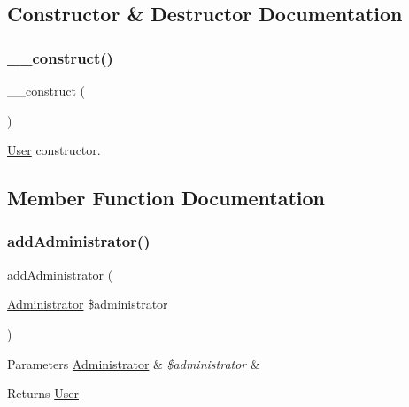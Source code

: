 \subsection{Constructor \& Destructor Documentation}
\mbox{\label{class_app_1_1_entity_1_1_user_a095c5d389db211932136b53f25f39685}} 
\subsubsection{\texorpdfstring{\_\_construct()}{\_\_construct()}}
{\footnotesize\ttfamily \+\_\+\+\_\+construct (\begin{DoxyParamCaption}{ }\end{DoxyParamCaption})}

\mbox{\hyperlink{class_app_1_1_entity_1_1_user}{User}} constructor. 

\subsection{Member Function Documentation}
\mbox{\label{class_app_1_1_entity_1_1_user_addad08591dc28219455a908890821b87}} 
\subsubsection{\texorpdfstring{addAdministrator()}{addAdministrator()}}
{\footnotesize\ttfamily add\+Administrator (\begin{DoxyParamCaption}\item[{\mbox{\hyperlink{class_app_1_1_entity_1_1_administrator}{Administrator}}}]{\$administrator }\end{DoxyParamCaption})}


\begin{DoxyParams}[1]{Parameters}
\mbox{\hyperlink{class_app_1_1_entity_1_1_administrator}{Administrator}} & {\em \$administrator} & \\
\hline
\end{DoxyParams}
\begin{DoxyReturn}{Returns}
\mbox{\hyperlink{class_app_1_1_entity_1_1_user}{User}} 
\end{DoxyReturn}
\mbox{\label{class_app_1_1_entity_1_1_user_ab1bd9da22af2775fc86ee59c38674271}} 
